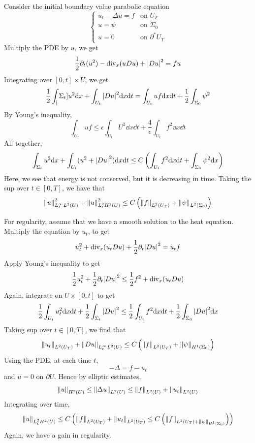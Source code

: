 \documentclass{article}
\begin{document}
Consider the initial boundary value parabolic equation
\[\begin{cases}
    u_t - \Delta u = f &\text{on }U_T \\
    u = \psi & \text{on }\Sigma_0 \\
    u = 0 &\text{on }\partial^* U_T
\end{cases}\]
Multiply the PDE by \(u\), we get
\[\frac{1}{2}\partial_t(u^2) - \mathrm{div}_x(u Du) + \abs{Du}^2 = fu\]
Integrating over \([0, t] \times U\), we get
\[\frac{1}{2}\int_[\Sigma_t]u^2 \dd x + \int_{U_t}\abs{Du}^2 \dd x\dd t = \int_{U_t}uf \dd x \dd t + \frac{1}{2}\int_{\Sigma_0}\psi^2\]
By Young's inequality,
\[\int_{U_t}uf \le \epsilon\int_{U_t}U^2\dd x\dd t + \frac{4}{\epsilon}\int_{U_t}f^2\dd x \dd t\]
All together,
\[\int_{\Sigma_t}u^2\dd x + \int_{U_t}(u^2 + \abs{Du}^2)\dd x\dd t \le C\left(\int_{U_t}f^2\dd x \dd t + \int_{\Sigma_0}\psi^2\dd x\right)\]
Here, we see that energy is not conserved, but it is decreasing in time. Taking the sup over \(t \in [0, T]\), we have that
\[\norm{u}^2_{L^\infty_tL^2(U)} + \norm{u}^2_{L^2_tH^1(U)} \le C\left(\norm{f}_{L^2(U_T)} + \norm{\psi}_{L^2(\Sigma_0)}\right)\]

For regularity, assume that we have a smooth solution to the heat equation. Multiply the equation by \(u_t\), to get
\[u_t^2 + \mathrm{div}_x(u_tDu) + \frac12\partial_t\abs{Du}^2 = u_tf\]
Apply Young's inequality to get
\[\frac{1}{2}u_t^2 + \frac{1}{2}\partial_t \abs{Du}^2 \le \frac{1}{2}f^2 + \mathrm{div}_x(u_t Du)\]
Again, integrate on \(U \times [0, t]\) to get
\[\frac{1}{2}\int_{U_t}u_t^2\dd x\dd t + \frac{1}{2}\int_{\Sigma_t}\abs{Du}^2 \le \frac{1}{2}\int_{U_t}f^2\dd x \dd t + \frac{1}{2}\int_{\Sigma_0}\abs{Du}^2\dd x\]
Taking sup over \(t \in [0, T]\), we find that
\[\norm{u_t}_{L^2(U_T)} + \norm{Du}_{L^\infty_tL^2(U)} \le C\left(\norm{f}_{L^2(U_T)} + \norm{\psi}_{H^1(\Sigma_0)}\right)\]
Using the PDE, at each time \(t\),
\[-\Delta = f - u_t\]
and \(u = 0\) on \(\partial U\). Hence by elliptic estimates,
\[\norm{u}_{H^2(U)} \le \norm{\Delta u}_{L^2(U)} \le \norm{f}_{L^2(U)} + \norm{u_t}_{L^2(U)}\]
Integrating over time,
\[\norm{u}_{L^2_tH^2(U)} \le C\left(\norm{f}_{L^2(U_T)} + \norm{u_t}_{L^2(U_T)} \le C\left(\norm{f}_{L^2(U_T) + \norm{\psi}_{H^1(\Sigma_0)}}\right)\right)\]
Again, we have a gain in regularity.

\printindex
\end{document}
